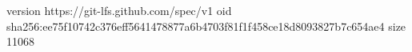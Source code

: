 version https://git-lfs.github.com/spec/v1
oid sha256:ee75f10742c376eff5641478877a6b4703f81f1f458ce18d8093827b7c654ae4
size 11068
